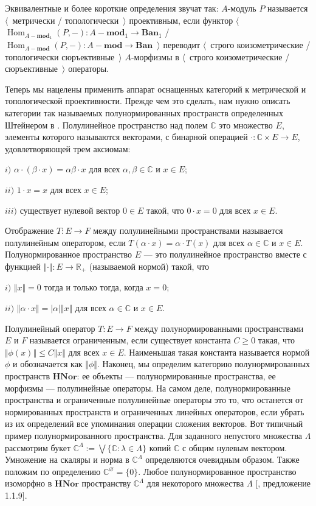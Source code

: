 Эквивалентные и более короткие определения звучат так: $A$-модуль $P$ называется $\langle$~метрически / топологически~$\rangle$ проективным, если функтор $\langle$~$\operatorname{Hom}_{A-\mathbf{mod}_1}(P,-):A-\mathbf{mod}_1\to\mathbf{Ban}_1$ / $\operatorname{Hom}_{A-\mathbf{mod}}(P,-):A-\mathbf{mod}\to\mathbf{Ban}$~$\rangle$ переводит $\langle$~строго коизометрические / топологически сюръективные~$\rangle$ $A$-морфизмы в $\langle$~строго коизометрические / сюръективные~$\rangle$ операторы.

Теперь мы нацелены применить аппарат оснащенных категорий к метрической и топологической проективности. Прежде чем это сделать, нам нужно описать категории так называемых полунормированных пространств определенных Штейнером в \cite{ShtTopFrClassicQuantMod}. Полулинейное пространство над полем $\mathbb{C}$ это множество $E$, элементы которого называются векторами, с бинарной операцией $\cdot:\mathbb{C}\times E\to E$, удовлетворяющей трем аксиомам:

$i)$ $\alpha\cdot(\beta\cdot x)=\alpha\beta\cdot x$ для всех $\alpha,\beta\in\mathbb{C}$ и $x\in E$; 

$ii)$ $1\cdot x=x$ для всех $x\in E$; 

$iii)$ существует нулевой вектор $0\in E$ такой, что $0\cdot x=0$ для всех $x\in E$. 

Отображение $T:E\to F$ между полулинейными пространствами называется полулинейным оператором, если $T(\alpha\cdot x)=\alpha\cdot T(x)$ для всех $\alpha\in\mathbb{C}$ и $x\in E$. Полунормированное пространство $E$ --- это полулинейное пространство вместе с функцией  $\Vert\cdot\Vert:E\to\mathbb{R}_+$ (называемой нормой) такой, что

$i)$ $\Vert x\Vert=0$ тогда и только тогда, когда $x=0$;

$ii)$ $\Vert\alpha\cdot x\Vert=|\alpha|\Vert x\Vert$ для всех $\alpha\in\mathbb{C}$ и $x\in E$. 

Полулинейный оператор $T:E\to F$ между полунормированными пространствами $E$ и $F$ называется ограниченным, если существует константа $C\geq 0$ такая, что $\Vert\phi(x)\Vert\leq C\Vert x\Vert$ для всех $x\in E$. Наименьшая такая константа называется нормой $\phi$ и обозначается как $\Vert \phi\Vert$. Наконец, мы определим категорию полунормированных пространств $\mathbf{HNor}$: ее объекты --- полунормированные пространства, ее морфизмы --- полулинейные операторы. На самом деле, полунормированные пространства и ограниченные полулинейные операторы это то, что останется от нормированных пространств и ограниченных линейных операторов, если убрать из их определений все упоминания операции сложения векторов. Вот типичный пример  полунормированного пространства. Для заданного непустого множества $\Lambda$ рассмотрим букет $\mathbb{C}^\Lambda:=\bigvee \{\mathbb{C}:\lambda\in\Lambda\}$ копий $\mathbb{C}$ с общим нулевым вектором. Умножение на скаляры и норма в $\mathbb{C}^\Lambda$ определяются очевидным образом. Также положим по определению $\mathbb{C}^\varnothing=\{0\}$. Любое полунормированное пространство изоморфно в $\mathbf{HNor}$ пространству $\mathbb{C}^\Lambda$ для некоторого множества $\Lambda$ [\cite{ShtTopFrClassicQuantMod}, предложение 1.1.9].

